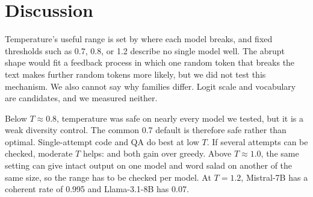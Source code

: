 \section{Discussion}
\label{sec:discussion}

Temperature's useful range is set by where each model breaks, and fixed thresholds such as 0.7, 0.8, or 1.2 describe no single model well. The abrupt shape would fit a feedback process in which one random token that breaks the text makes further random tokens more likely, but we did not test this mechanism. We also cannot say why families differ. Logit scale and vocabulary are candidates, and we measured neither.

Below $T \approx 0.8$, temperature was safe on nearly every model we tested, but it is a weak diversity control. The common 0.7 default is therefore safe rather than optimal. Single-attempt code and QA do best at low $T$. If several attempts can be checked, moderate $T$ helps: \passfour and \coverfour both gain over greedy. Above $T \approx 1.0$, the same setting can give intact output on one model and word salad on another of the same size, so the range has to be checked per model. At $T = 1.2$, Mistral-7B has a coherent rate of 0.995 and Llama-3.1-8B has 0.07.

